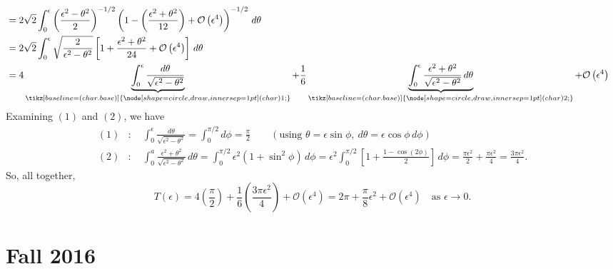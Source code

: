 \documentclass[10pt,letterpaper]{report}
\newcommand{\Ord}[1]{\mathcal{O}\left({#1}\right)}
\newcommand{\circled}[1]{\tikz[baseline=(char.base)]{\node[shape=circle,draw,inner sep=1pt] (char) {\scriptsize #1};}}
\newcommand{\undernum}[2]{\underbrace{#1}_{\circled{#2}}}
\renewcommand{\chaptermark}[1]{%
\markboth{#1}{}}
\begin{document}
\begin{enumerate}
\begin{align*}
    \\
    &=
    2 \sqrt 2 \int_0^\epsilon \left(\frac{\epsilon^2 - \theta^2}{2}\right)^{-1/2}\left(1 - \left(\frac{\epsilon^2 + \theta^2}{12}\right) + \Ord{\epsilon^4}\right)^{-1/2}\,d\theta
    \\
    &=
    2 \sqrt 2 \int_0^\epsilon \sqrt{\frac{2}{\epsilon^2 - \theta^2}}\left[1 + \frac{\epsilon^2 + \theta^2}{24} + \Ord{\epsilon^4}\right]\,d\theta
    \\
    &=
    4 \undernum{\int_0^\epsilon \frac{d\theta}{\sqrt{\epsilon^2 - \theta^2}}}{1} + \frac{1}{6}\undernum{\int_0^\epsilon\frac{\epsilon^2 + \theta^2}{\sqrt{\epsilon^2 - \theta^2}}\,d\theta}{2} + \Ord{\epsilon^4}
\end{align*}
Examining $(1)$ and $(2)$, we have
\begin{align*}
    (1) &:\quad \int_0^\epsilon \frac{d\theta}{\sqrt{\epsilon^2 - \theta^2}} = \int_0^{\pi/2}d\phi = \frac{\pi}{2} \qquad \left(\textrm{using }\theta = \epsilon\sin\phi,\ d\theta = \epsilon\cos\phi\,d\phi\right)
    \\
    (2) &:\quad \int_0^a\frac{\epsilon^2 + \theta^2}{\sqrt{\epsilon^2 - \theta^2}}\,d\theta
    =
    \int_0^{\pi/2}\epsilon^2(1+\sin^2\phi)\,d\phi 
    =
    \epsilon^2\int_0^{\pi/2}\left[ 1 + \frac{1 - \cos(2\phi)}{2}\right]\,d\phi
    =
    \frac{\pi \epsilon^2}{2} + \frac{\pi \epsilon^2}{4} = \frac{3\pi \epsilon^2}{4}.
\end{align*}
So, all together,
\[
T(\epsilon) = 4\left(\frac{\pi}{2}\right) + \frac{1}{6}\left(\frac{3\pi \epsilon^2}{4}\right) + \Ord{\epsilon^4} = 2\pi + \frac{\pi}{8}\epsilon^2 + \Ord{\epsilon^4} \quad \textrm{as }\epsilon\to 0.
\]


\end{enumerate}

\chapter*{Fall 2016}
\chaptermark{Fall 2016}
\end{document}
